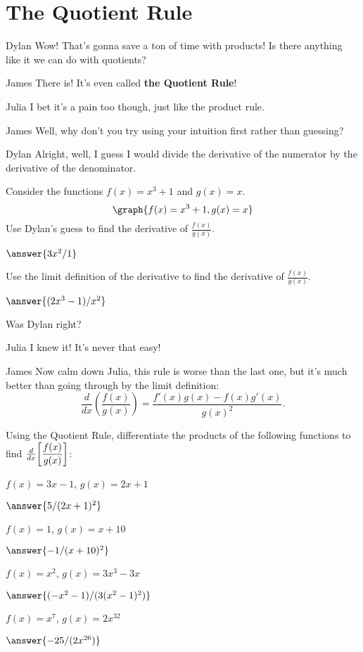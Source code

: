 \documentclass{ximera}
\begin{document}
\section{The Quotient Rule}
\begin{dialogue}
\item[Dylan] Wow! That's gonna save a ton of time with products! Is there anything like it we can do with quotients?
\item[James] There is! It's even called \textbf{the Quotient Rule}!
\item[Julia] I bet it's a pain too though, just like the product rule.
\item[James] Well, why don't you try using your intuition first rather than guessing?
\item[Dylan] Alright, well, I guess I would divide the derivative of the numerator by the derivative of the denominator.
\end{dialogue}
\begin{question}
Consider the functions $f(x) = x^3+1$ and $g(x) = x$.
\[
\graph{f(x)=x^3+1, g(x)=x}
\]
Use Dylan's guess to find the derivative of $\frac{f(x)}{g(x)}$.

$\answer{3x^2/1}$

Use the limit definition of the derivative to find the derivative of $\frac{f(x)}{g(x)}$.

$\answer{(2x^3-1)/x^2}$

Was Dylan right?

\begin{multipleChoice}
\end{multipleChoice}
\end{question}
\begin{dialogue}
\item[Julia] I knew it! It's never that easy!
\item[James] Now calm down Julia, this rule is worse than the last one, but it's much better than going through by the limit definition:  $$\frac{d}{dx}\left( \frac{f(x)}{g(x)}\right) = \frac{f'(x)g(x)-f(x)g'(x)}{g(x)^2}\text{.}$$
\end{dialogue}
\begin{question}
Using the Quotient Rule, differentiate the products of the following functions to find $\frac{d}{dx}\bigg[ \dfrac{f(x)}{g(x)} \bigg]$:

$f(x) = 3x-1$, $g(x) = 2x+1$

$\answer{5/(2x+1)^2}$

$f(x) = 1$, $g(x) = x+10$

$\answer{-1/(x+10)^2}$

$f(x) = x^2$, $g(x) = 3x^3-3x$

$\answer{(-x^2-1)/(3(x^2-1)^2)}$

$f(x) = x^7$, $g(x) = 2x^{32}$

$\answer{-25/(2x^{26})}$
\end{question}
\end{document}

